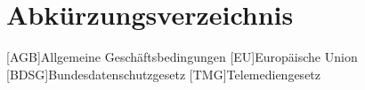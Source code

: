 \clearpage
\chapter*{Abkürzungsverzeichnis}	


\begin{acronym}[RDBMS]
	[AGB]{Allgemeine Geschäftsbedingungen}
	[EU]{Europäische Union}
	[BDSG]{Bundesdatenschutzgesetz}
	[TMG]{Telemediengesetz}
\end{acronym}
